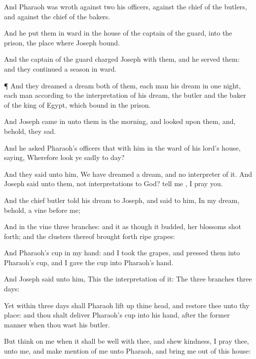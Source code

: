 {And
Pharaoh was
wroth
against
two
{} his
officers, against the
chief of the
butlers, and against the
chief of the
bakers.

And he
put them in
ward in the
house of the
captain of the
guard, into the
prison, the
place where
Joseph
{}
bound.

And the
captain of the
guard
charged
Joseph with them, and he
served them: and they continued a
season in
ward.


\par }{\PP {}¶ And they
dreamed a
dream both of
them, each
man his
dream in
one
night, each
man according to the
interpretation of his
dream, the
butler and the
baker of the
king of
Egypt, which
{}
bound in the
prison.

And
Joseph came
in unto them in the
morning, and
looked upon them, and, behold, they
{}
sad.

And he
asked
Pharaoh’s
officers that
{} with him in the
ward of his
lord’s
house,
saying, Wherefore
look ye
{}
sadly to
day?

And they
said unto him, We have
dreamed a
dream, and
{} no
interpreter of it. And
Joseph
said unto them,
{} not
interpretations
{} to
God? tell
me
{}, I pray you.

And the
chief
butler
told his
dream to
Joseph, and
said to him, In my
dream, behold, a
vine
{} before
me;

And in the
vine
{}
three
branches: and it
{} as though it
budded,
{} her
blossoms shot
forth; and the
clusters thereof brought forth
ripe
grapes:

And
Pharaoh’s
cup
{} in my
hand: and I
took the
grapes, and
pressed them into
Pharaoh’s
cup, and I
gave the
cup into
Pharaoh’s
hand.

And
Joseph
said unto him, This
{} the
interpretation of it: The
three
branches
{}
three
days:

Yet within
three
days shall
Pharaoh lift
up thine
head, and
restore thee unto thy
place: and thou shalt
deliver
Pharaoh’s
cup into his
hand, after the
former
manner when thou wast his
butler.

But
think on me when it shall be
well with thee, and
shew
kindness, I pray thee, unto me, and make
mention of me unto
Pharaoh, and bring
me out of this
house:

}
